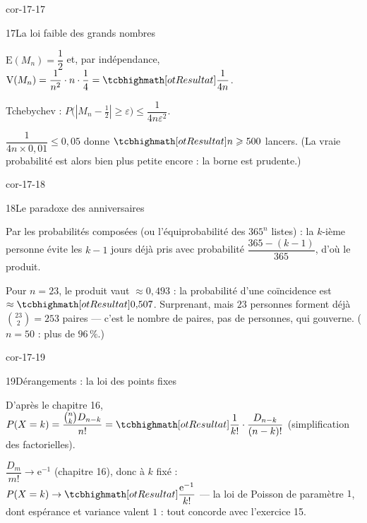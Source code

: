 \begin{blocLivre}{cor-17-17}
\begin{corrige}{17}{La loi faible des grands nombres}
\begin{questions}
  \item $\mathrm{E}(M_n)=\dfrac12$ et, par indépendance,
    $\mathrm{V}(M_n)=\dfrac{1}{n^{2}}\cdot n\cdot\dfrac14=\res{\dfrac{1}{4n}}$.
  \item Tchebychev :
    $P\bigl(|M_n-\tfrac12|\geqslant\varepsilon\bigr)
    \leqslant\dfrac{1}{4n\varepsilon^{2}}$.
  \item $\dfrac{1}{4n\times0{,}01}\leqslant0{,}05$ donne
    $\res{n\geqslant500}$ lancers. (La vraie probabilité est alors bien
    plus petite encore : la borne est prudente.)
\end{questions}
\end{corrige}
\end{blocLivre}

\begin{blocLivre}{cor-17-18}
\begin{corrige}{18}{Le paradoxe des anniversaires}
\begin{questions}
  \item Par les probabilités composées (ou l'équiprobabilité des
    $365^{n}$ listes) : la $k$-ième personne évite les $k-1$ jours déjà
    pris avec probabilité $\dfrac{365-(k-1)}{365}$, d'où le produit.
  \item Pour $n=23$, le produit vaut $\approx0{,}493$ : la probabilité
    d'une coïncidence est $\approx\res{0{,}507}$. Surprenant, mais
    $23$ personnes forment déjà $\binom{23}2=253$ paires — c'est le
    nombre de paires, pas de personnes, qui gouverne. ($n=50$ :
    plus de $96\,\%$.)
\end{questions}
\end{corrige}
\end{blocLivre}

\begin{blocLivre}{cor-17-19}
\begin{corrige}{19}{Dérangements : la loi des points fixes}
\begin{questions}
  \item D'après le chapitre 16,
    $P(X=k)=\dfrac{\binom nk D_{n-k}}{n!}
    =\res{\dfrac{1}{k!}\cdot\dfrac{D_{n-k}}{(n-k)!}}$
    (simplification des factorielles).
  \item $\dfrac{D_m}{m!}\to\mathrm{e}^{-1}$ (chapitre 16), donc à $k$
    fixé :
    $P(X=k)\to\res{\dfrac{\mathrm{e}^{-1}}{k!}}$ — la loi de Poisson de
    paramètre $1$, dont espérance et variance valent $1$ : tout concorde
    avec l'exercice 15.
\end{questions}
\end{corrige}
\end{blocLivre}

